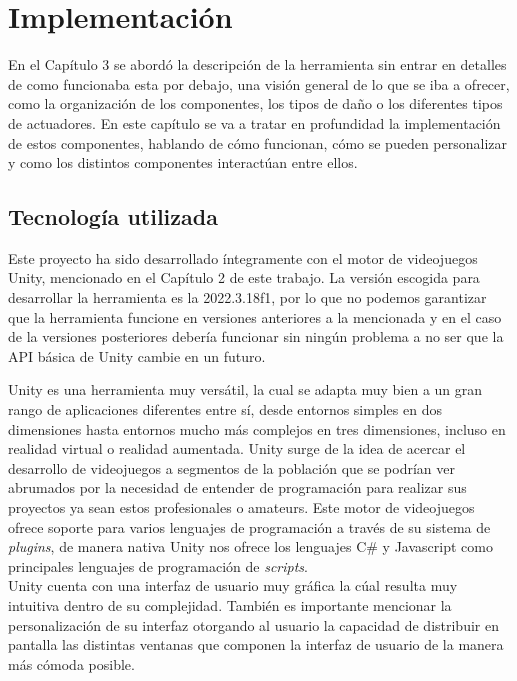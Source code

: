 \setcounter{secnumdepth}{3} %
\chapter{Implementaci\'on}
\label{cap:implementacion}
En el Capítulo 3 se abordó la descripción de la herramienta sin entrar en detalles de como funcionaba esta por debajo, una visión general de lo que se iba a ofrecer, como la organización de los componentes, los tipos de daño o los diferentes tipos de actuadores. En este capítulo se va a tratar en profundidad la implementación de estos componentes, hablando de cómo funcionan, cómo se pueden personalizar y como los distintos componentes interactúan entre ellos.


\section{Tecnología utilizada}
Este proyecto ha sido desarrollado íntegramente con el motor de videojuegos Unity, mencionado en el Capítulo 2 de este trabajo.
La versión escogida para desarrollar la herramienta es la 2022.3.18f1, por lo que no podemos garantizar que la herramienta funcione en versiones anteriores a la mencionada y en el caso de la versiones posteriores debería funcionar sin ningún problema a no ser que la API básica de Unity cambie en un futuro.\\

Unity es una herramienta muy versátil, la cual se adapta muy bien a un gran rango de aplicaciones diferentes entre sí, desde entornos simples en dos dimensiones hasta entornos mucho más complejos en tres dimensiones, incluso en realidad virtual o realidad aumentada.
Unity surge de la idea de acercar el desarrollo de videojuegos a segmentos de la población que se podrían ver abrumados por la necesidad de entender de programación para realizar sus proyectos ya sean estos profesionales o amateurs. Este motor de videojuegos ofrece soporte para varios lenguajes de programación a través de su sistema de \textit{plugins}, de manera nativa Unity nos ofrece los lenguajes C\# y Javascript como principales lenguajes de programación de \textit{scripts}.\\

Unity cuenta con una interfaz de usuario muy gráfica la cúal resulta muy intuitiva dentro de su complejidad. También es importante mencionar la personalización de su interfaz otorgando al usuario la capacidad de distribuir en pantalla las distintas ventanas que componen la interfaz de usuario de la manera más cómoda posible.\\

